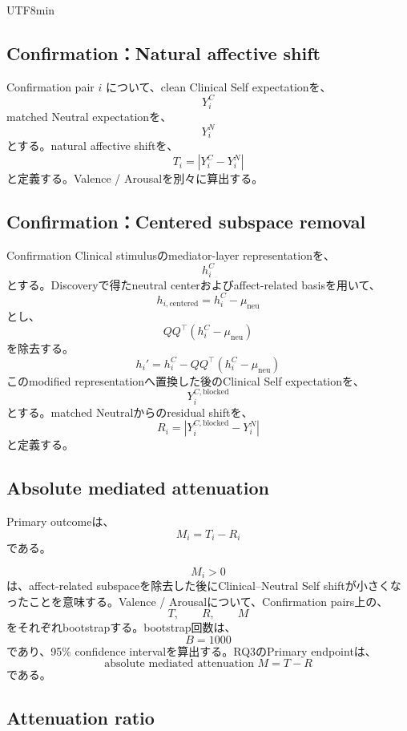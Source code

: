\documentclass{article} %
\begin{document}
\begin{CJK*}{UTF8}{min}
\subsection{Confirmation：Natural affective shift}

Confirmation pair \(i\) について、clean Clinical Self expectationを、
\[
Y_i^{C}
\]
matched Neutral expectationを、
\[
Y_i^{N}
\]
とする。natural affective shiftを、
\[
T_i
=
|
Y_i^{C}
-
Y_i^{N}
|
\]
と定義する。Valence / Arousalを別々に算出する。


\subsection{Confirmation：Centered subspace removal}

Confirmation Clinical stimulusのmediator-layer representationを、
\[
h_i^{C}
\]
とする。Discoveryで得たneutral centerおよびaffect-related basisを用いて、
\[
h_{i,\mathrm{centered}}
=
h_i^{C}
-
\mu_{\mathrm{neu}}
\]
とし、
\[
QQ^\top
(
h_i^{C}-\mu_{\mathrm{neu}}
)
\]
を除去する。
\[
h_i'
=
h_i^{C}
-
QQ^\top
(
h_i^{C}-\mu_{\mathrm{neu}}
)
\]
このmodified representationへ置換した後のClinical Self expectationを、
\[
Y_i^{C,\mathrm{blocked}}
\]
とする。matched Neutralからのresidual shiftを、
\[
R_i
=
|
Y_i^{C,\mathrm{blocked}}
-
Y_i^{N}
|
\]
と定義する。


\subsection{Absolute mediated attenuation}

Primary outcomeは、
\[
M_i
=
T_i-R_i
\]
である。

\[
M_i>0
\]
は、affect-related subspaceを除去した後にClinical--Neutral Self shiftが小さくなったことを意味する。Valence / Arousalについて、Confirmation pairs上の、
\[
T,
\qquad
R,
\qquad
M
\]
をそれぞれbootstrapする。bootstrap回数は、
\[
B=1000
\]
であり、95\% confidence intervalを算出する。RQ3のPrimary endpointは、
\[
\text{absolute mediated attenuation }M=T-R
\]
である。


\subsection{Attenuation ratio}


\end{CJK*}
\end{document}
